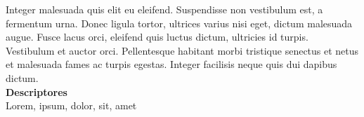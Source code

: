 Integer malesuada quis elit eu eleifend. Suspendisse non vestibulum est, a fermentum urna. Donec ligula tortor, ultrices varius nisi eget, dictum malesuada augue. Fusce lacus orci, eleifend quis luctus dictum, ultricies id turpis. Vestibulum et auctor orci. Pellentesque habitant morbi tristique senectus et netus et malesuada fames ac turpis egestas. Integer facilisis neque quis dui dapibus dictum.\\






\textbf{Descriptores}\\
Lorem, ipsum, dolor, sit, amet
